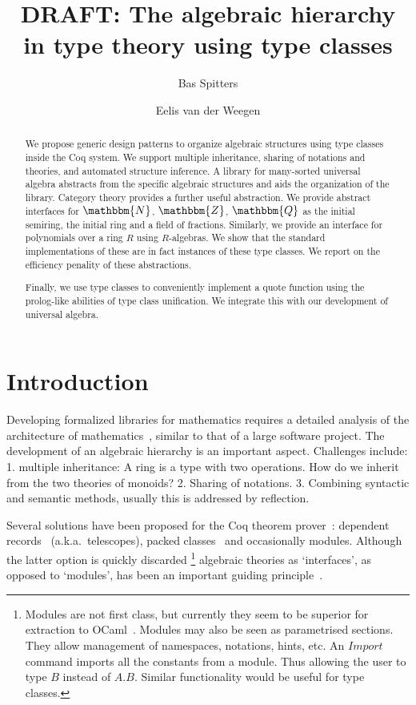\documentclass[a4paper,10pt, runningheads]{llncs}
\newcommand{\N}{\ensuremath{\mathbbm{N}}}
\newcommand{\Z}{\ensuremath{\mathbbm{Z}}}
\newcommand{\Q}{\ensuremath{\mathbbm{Q}}}
\newcommand{\Conid}[1]{\mathit{#1}}
\begin{document}
\title{DRAFT: The algebraic hierarchy in type theory using type classes}
\author{Bas Spitters \and Eelis van der Weegen}
\maketitle
\begin{abstract}
We propose generic design patterns to organize algebraic structures using type classes inside the
Coq system. We support multiple inheritance, sharing of notations and theories, and automated
structure inference. A library for many-sorted universal algebra abstracts from the specific
algebraic structures and aids the organization of the library. Category theory provides a further
useful abstraction. We provide abstract
interfaces for $\N$, $\Z$, $\Q$ as the initial semiring, the initial ring and a field of
fractions. Similarly, we provide an interface for polynomials over a ring $R$ using $R$-algebras.
We show that the standard implementations of these are in fact instances of these type classes.
We report on the efficiency penality of these abstractions.

Finally, we use type classes to conveniently implement a quote function using the prolog-like
abilities of type class unification. We integrate this with our development of universal algebra.
\end{abstract}

\section{Introduction}
Developing formalized libraries for mathematics requires a detailed analysis of the
architecture of mathematics~\cite{C-corn,DBLP:conf/types/HaftmannW08}, similar to that of a large
software project.
The development of an algebraic hierarchy is an important aspect. Challenges include: 1. multiple
inheritance: A ring is a type with two operations. How do we inherit from the two theories of
monoids? 2. Sharing of notations. 3. Combining syntactic and semantic methods, usually this is
addressed by reflection.

Several solutions have been proposed for the Coq theorem prover~\cite{Coq,BC04}: dependent
records~\cite{DBLP:journals/jsc/GeuversPWZ02} (a.k.a.\ telescopes), packed classes~\cite{Packed} and
occasionally modules. Although the latter option is quickly discarded%
\footnote{Modules are not first class, but currently they seem to be superior for extraction to
OCaml~\cite{letouzey02}. Modules may also be seen as parametrised sections. They allow management
of namespaces, notations, hints, etc. An \ensuremath{\Conid{Import}} command imports all the constants from a
module. Thus allowing the user to type \ensuremath{\Conid{B}} instead of \ensuremath{\Conid{A.B}}. Similar functionality would be useful
for type classes.}
algebraic theories as `interfaces', as opposed to `modules', has been an important
guiding principle~\cite{Packed}.
\end{document}
